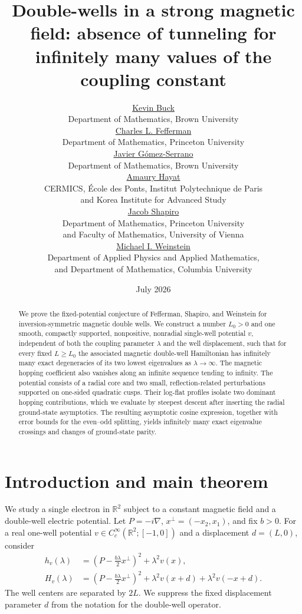 \documentclass[11pt]{article}
\title{Double-wells in a strong magnetic field: absence of tunneling for
infinitely many values of the coupling constant}
\author{
    \href{mailto:kevin_buck@brown.edu}{Kevin Buck}\\
    {\footnotesize Department of Mathematics, Brown University}\\[0.5em]
    \href{mailto:cf@math.princeton.edu}{Charles L. Fefferman}\\
    {\footnotesize Department of Mathematics, Princeton University}\\[0.5em]
    \href{mailto:javier_gomez_serrano@brown.edu}{Javier G\'omez-Serrano}\\
    {\footnotesize Department of Mathematics, Brown University}\\[0.5em]
    \href{mailto:amaury.hayat@enpc.fr}{Amaury Hayat}\\
    {\footnotesize CERMICS, \'Ecole des Ponts, Institut Polytechnique de Paris}\\
    {\footnotesize and Korea Institute for Advanced Study}\\[0.5em]
    \href{mailto:jacobshapiro@princeton.edu}{Jacob Shapiro}\\
{\footnotesize Department of Mathematics, Princeton University}\\
{\footnotesize and Faculty of Mathematics, University of Vienna}\\[0.5em]
    \href{mailto:miw2103@columbia.edu}{Michael I. Weinstein}\\
    {\footnotesize Department of Applied Physics and Applied Mathematics,}\\
    {\footnotesize and Department of Mathematics, Columbia University}
}
\date{July 2026}
\newcommand{\R}{\mathbb R}
\begin{document}
\maketitle

\begin{abstract}
We prove the fixed-potential conjecture of Fefferman, Shapiro, and Weinstein
for inversion-symmetric magnetic double wells.  We construct a number
$L_0>0$ and one smooth, compactly supported, nonpositive, nonradial
single-well potential $v$, independent of both the coupling parameter
$\lambda$ and the well displacement, such that for every fixed $L\ge L_0$
the associated magnetic double-well Hamiltonian has infinitely many exact
degeneracies of its two lowest eigenvalues as $\lambda\to\infty$.
The magnetic hopping coefficient also vanishes along an infinite sequence
tending to infinity.  The potential consists of a radial core and two
small, reflection-related perturbations supported on one-sided quadratic
cusps.  Their log-flat profiles isolate two dominant hopping contributions,
which we evaluate by steepest descent after inserting the radial
ground-state asymptotics.  The resulting asymptotic cosine expression, together with
error bounds for the even--odd splitting, yields infinitely many exact eigenvalue
crossings and changes of ground-state parity.
\end{abstract}
\tableofcontents

\section{Introduction and main theorem}\label{sec:introduction}

We study a single electron in $\R^2$ subject to a constant magnetic field
and a double-well electric potential. Let $P=-i\nabla$,
$x^\perp=(-x_2,x_1)$, and fix $b>0$. For a real one-well potential
$v\in C_c^\infty(\R^2;[-1,0])$ and a displacement $d=(L,0)$, consider
\begin{align}
 h_v(\lambda)&=\left(P-\frac{b\lambda}{2}x^\perp\right)^2
 +\lambda^2v(x),\label{eq:one-well-unscaled}\\
 H_v(\lambda)&=\left(P-\frac{b\lambda}{2}x^\perp\right)^2
 +\lambda^2v(x+d)+\lambda^2v(-x+d).
 \label{eq:double-well-unscaled}
\end{align}
The well centers are separated by $2L$. We suppress the fixed displacement
parameter $d$ from the notation for the double-well operator.
\end{document}
